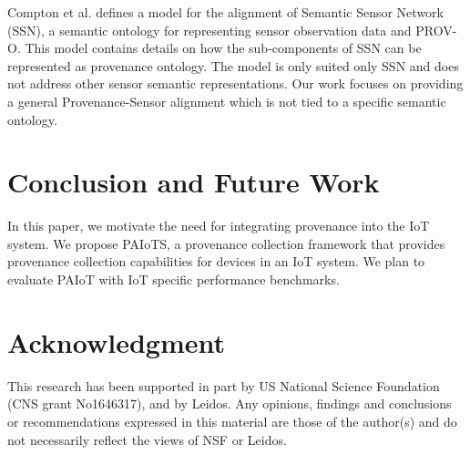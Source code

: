 \documentclass[conference]{IEEEtran}
\begin{document}
\par Compton et al.\cite{compton2014sensor} defines a model for the alignment of Semantic Sensor Network (SSN), a semantic ontology for representing sensor observation data and PROV-O. This model contains details on how the sub-components of SSN can be represented as provenance ontology. The model is only suited only SSN and does not address other sensor semantic representations. Our work focuses on providing a general Provenance-Sensor alignment which is not tied to a specific semantic ontology.

\section{Conclusion and Future Work}
In this paper, we motivate the need for integrating provenance into the IoT system. 
We propose PAIoTS, a provenance collection framework that provides provenance collection capabilities for devices in an IoT system. We plan to evaluate PAIoT with IoT specific performance benchmarks. 




%
%
%






\section*{Acknowledgment}

This research has been supported in part by US National Science Foundation
 (CNS grant No1646317), and by Leidos. Any opinions, findings and conclusions or recommendations expressed in this material are those of the author(s) and do not necessarily reflect the views of NSF or Leidos.





\end{document}
